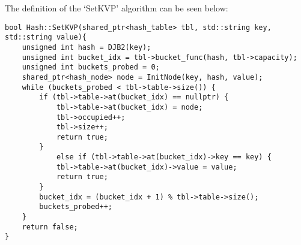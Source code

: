 \begin{highlight}

The definition of the `SetKVP' algorithm can be seen below:

\horizontalline

\begin{verbatim}
bool Hash::SetKVP(shared_ptr<hash_table> tbl, std::string key, std::string value){
    unsigned int hash = DJB2(key);
    unsigned int bucket_idx = tbl->bucket_func(hash, tbl->capacity);
    unsigned int buckets_probed = 0;
    shared_ptr<hash_node> node = InitNode(key, hash, value);
    while (buckets_probed < tbl->table->size()) {
        if (tbl->table->at(bucket_idx) == nullptr) {
            tbl->table->at(bucket_idx) = node;
            tbl->occupied++;
            tbl->size++;
            return true;
        }
            else if (tbl->table->at(bucket_idx)->key == key) {
            tbl->table->at(bucket_idx)->value = value;
            return true;
        }
        bucket_idx = (bucket_idx + 1) % tbl->table->size();
        buckets_probed++;
    }
    return false;
}
\end{verbatim}

\end{highlight}